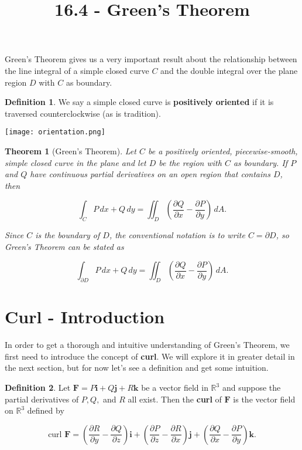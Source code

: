 \documentclass[11pt,oneside,english]{amsart}
\newtheorem{theorem}{Theorem}
\theoremstyle{definition}
\newtheorem*{definition}{Definition}
\newcommand{\R}{\mathbb{R}}
\newcommand{\pp}[2]{\frac{\partial{#1}}{\partial{#2}}}
\begin{document}
\vspace*{-1cm}
\title{16.4 - Green's Theorem}
\maketitle

Green's Theorem gives us a very important result about the relationship between the line integral of a simple closed curve $C$ and the double integral over the plane region $D$ with $C$ as boundary.

\begin{definition}
We say a simple closed curve is \textbf{positively oriented} if it is traversed counterclockwise (as is tradition).
\end{definition}

\begin{center}
\texttt{[image: orientation.png]}
\end{center}

\vspace{7mm}
\begin{theorem}[Green's Theorem]
Let $C$ be a positively oriented, piecewise-smooth, simple closed curve in the plane and let $D$ be the region with $C$ as boundary. If $P$ and $Q$ have continuous partial derivatives on an open region that contains $D$, then

\[
\int_CP\,dx + Q\,dy=\iint_D\left(\pp{Q}{x}-\pp{P}{y}\right)\,dA.
\]

Since $C$ is the boundary of $D$, the conventional notation is to write $C=\partial D$, so Green's Theorem can be stated as

\[
\int_{\partial D}P\,dx + Q\,dy=\iint_D\left(\pp{Q}{x}-\pp{P}{y}\right)\,dA.
\]

\end{theorem}
\pagebreak


\section*{Curl - Introduction}

In order to get a thorough and intuitive understanding of Green's Theorem, we first need to introduce the concept of \textbf{curl}. We will explore it in greater detail in the next section, but for now let's see a definition and get some intuition.

\begin{definition}
Let $\mathbf{F}=P\mathbf{i}+Q\mathbf{j}+R\mathbf{k}$ be a vector field in $\R^3$ and suppose the partial derivatives of $P,Q,$ and $R$ all exist. Then the \textbf{curl} of $\mathbf{F}$ is the vector field on $\R^3$ defined by

\[
\text{curl }\mathbf{F}=\left(\pp{R}{y}-\pp{Q}{z}\right)\mathbf{i}+\left(\pp{P}{z}-\pp{R}{x}\right)\mathbf{j}+\left(\pp{Q}{x}-\pp{P}{y}\right)\mathbf{k}.
\]
\end{definition}
 
\end{document}

